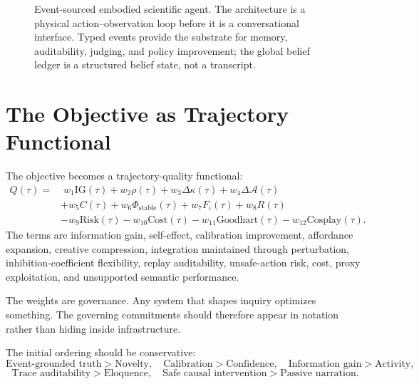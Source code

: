 \documentclass[11pt]{article}
\newcommand{\A}{\mathcal{A}}
\newcommand{\IG}{\mathrm{IG}}
\newcommand{\Cosplay}{\mathrm{Cosplay}}
\newcommand{\Risk}{\mathrm{Risk}}
\newcommand{\Cost}{\mathrm{Cost}}
\newcommand{\Goodhart}{\mathrm{Goodhart}}
\begin{document}
\begin{figure}[H]
{}
\caption{Event-sourced embodied scientific agent. The architecture is a physical action--observation loop before it is a conversational interface. Typed events provide the substrate for memory, auditability, judging, and policy improvement; the global belief ledger is a structured belief state, not a transcript.}
\label{fig:event-agent}
\end{figure}



\section{The Objective as Trajectory Functional}

The objective becomes a trajectory-quality functional:
\begin{align}
Q(\tau)=&\;w_1\IG(\tau)+w_2\rho(\tau)+w_3\Delta\kappa(\tau)+w_4\Delta\A(\tau) \\
&+w_5C(\tau)+w_6\Phi_{\mathrm{stable}}(\tau)+w_7F_\iota(\tau)+w_8R(\tau) \\
&-w_9\Risk(\tau)-w_{10}\Cost(\tau)-w_{11}\Goodhart(\tau)-w_{12}\Cosplay(\tau).
\end{align}
The terms are information gain, self-effect, calibration improvement, affordance expansion, creative compression, integration maintained through perturbation, inhibition-coefficient flexibility, replay auditability, unsafe-action risk, cost, proxy exploitation, and unsupported semantic performance.

The weights are governance. Any system that shapes inquiry optimizes something. The governing commitments should therefore appear in notation rather than hiding inside infrastructure.

The initial ordering should be conservative:
\begin{equation}
\text{Event-grounded truth} > \text{Novelty},\quad
\text{Calibration} > \text{Confidence},\quad
\text{Information gain} > \text{Activity},
\end{equation}
\begin{equation}
\text{Trace auditability} > \text{Eloquence},\quad
\text{Safe causal intervention} > \text{Passive narration}.
\end{equation}
\end{document}
